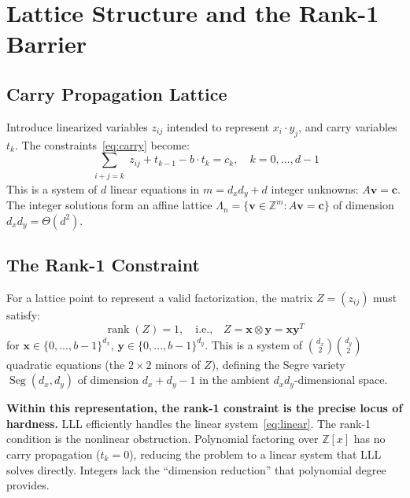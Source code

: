 \documentclass[11pt,a4paper]{article}
\DeclareMathOperator{\rank}{rank}
\DeclareMathOperator{\Seg}{Seg}
\begin{document}
\section{Lattice Structure and the Rank-1 Barrier}
\label{sec:lattice}

\subsection{Carry Propagation Lattice}

Introduce linearized variables $z_{ij}$ intended to represent $x_i \cdot y_j$, and carry variables $t_k$. The constraints~\eqref{eq:carry} become:
\begin{equation}\label{eq:linear}
\sum_{\substack{i+j=k}} z_{ij} + t_{k-1} - b \cdot t_k = c_k, \quad k = 0, \ldots, d-1
\end{equation}
This is a system of $d$ linear equations in $m = d_x d_y + d$ integer unknowns: $A\mathbf{v} = \mathbf{c}$.
The integer solutions form an affine lattice $\Lambda_n = \{\mathbf{v} \in \mathbb{Z}^m : A\mathbf{v} = \mathbf{c}\}$ of dimension $d_x d_y = \Theta(d^2)$.

\subsection{The Rank-1 Constraint}

For a lattice point to represent a valid factorization, the matrix $Z = (z_{ij})$ must satisfy:
\begin{equation}
\rank(Z) = 1, \quad \text{i.e.,} \quad Z = \mathbf{x} \otimes \mathbf{y} = \mathbf{x}\mathbf{y}^T
\end{equation}
for $\mathbf{x} \in \{0,\ldots,b{-}1\}^{d_x}$, $\mathbf{y} \in \{0,\ldots,b{-}1\}^{d_y}$. This is a system of $\binom{d_x}{2}\binom{d_y}{2}$ quadratic equations (the $2 \times 2$ minors of $Z$), defining the Segre variety $\Seg(d_x, d_y)$ of dimension $d_x + d_y - 1$ in the ambient $d_x d_y$-dimensional space.

\textbf{Within this representation, the rank-1 constraint is the precise locus of hardness.} LLL efficiently handles the linear system~\eqref{eq:linear}. The rank-1 condition is the nonlinear obstruction.  Polynomial factoring over $\mathbb{Z}[x]$ has no carry propagation ($t_k = 0$), reducing the problem to a linear system that LLL solves directly.  Integers lack the ``dimension reduction'' that polynomial degree provides.
\end{document}
